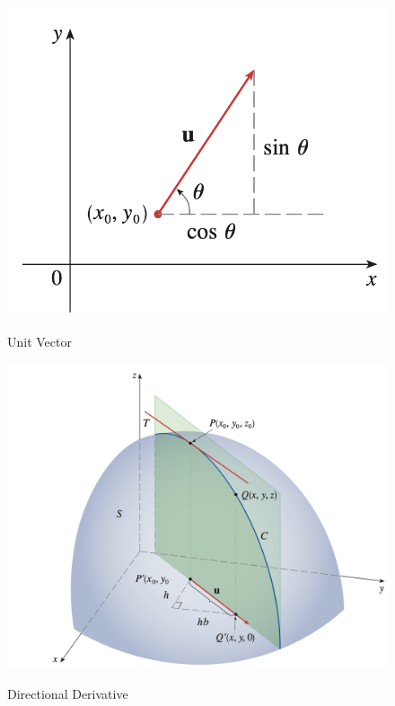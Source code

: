 \begin{figure}[h]
    \centering
    \cite{calculus}
    \includegraphics[scale=0.6]{chapter002/figures/fig003}
    \caption{Unit Vector}
    \label{fig:Unit Vector}
\end{figure}

\begin{figure}[h]
    \centering
    \cite{calculus}
    \includegraphics[scale=0.5]{chapter002/figures/fig001}
    \caption{Directional Derivative}
    \label{fig:Directional Derivative}
\end{figure}

